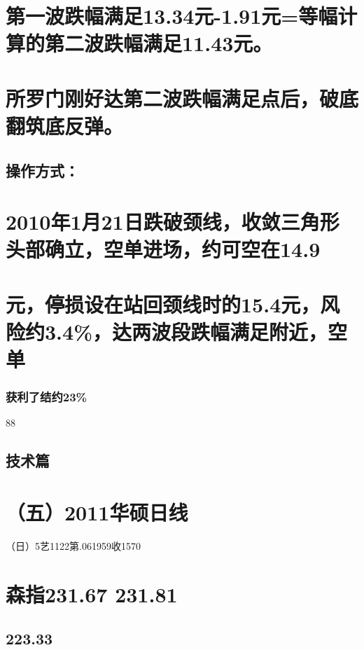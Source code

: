\documentclass{article}
\begin{document}
\section{第一波跌幅满足13.34元-1.91元=等幅计算的第二波跌幅满足11.43元。}

\section{所罗门刚好达第二波跌幅满足点后，破底翻筑底反弹。}

\subsection{操作方式：}

\section{2010年1月21日跌破颈线，收敛三角形头部确立，空单进场，约可空在14.9}

\section{元，停损设在站回颈线时的15.4元，风险约3.4\%，达两波段跌幅满足附近，空单}

\subsubsection{获利了结约23\%}

88

\clearpage

\subsection{技术篇}

\section{（五）2011华硕日线}

（日）5艺1122第.061959收1570

\section{森指231.67 231.81}

\subsection{223.33}
\end{document}
